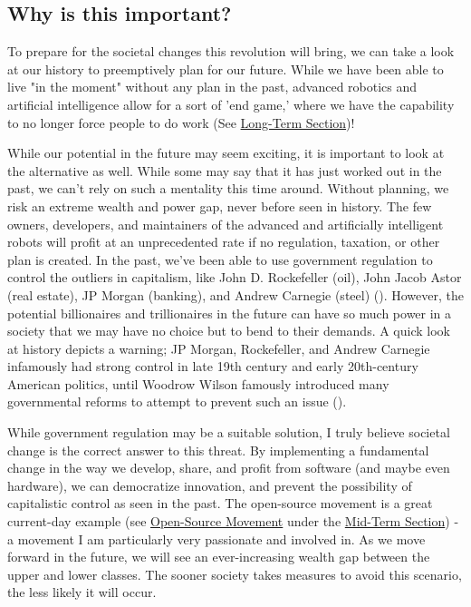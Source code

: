 \subsection{Why is this important?}

To prepare for the societal changes this revolution will bring, we can take a look at our history to preemptively plan for our future. While we have been able to live "in the moment" without any plan in the past, advanced robotics and artificial intelligence allow for a sort of 'end game,' where we have the capability to no longer force people to do work (See \hyperref[sec:long]{Long-Term Section})!

While our potential in the future may seem exciting, it is important to look at the alternative as well. While some may say that it has just worked out in the past, we can't rely on such a mentality this time around. Without planning, we risk an extreme wealth and power gap, never before seen in history. The few owners, developers, and maintainers of the advanced and artificially intelligent robots will profit at an unprecedented rate if no regulation, taxation, or other plan is created. In the past, we've been able to use government regulation to control the outliers in capitalism, like John D. Rockefeller (oil), John Jacob Astor (real estate), JP Morgan (banking), and Andrew Carnegie (steel) (\cite{CapitalistAmerica}). However, the potential billionaires and trillionaires in the future can have so much power in a society that we may have no choice but to bend to their demands. A quick look at history depicts a warning; JP Morgan, Rockefeller, and Andrew Carnegie infamously had strong control in late 19th century and early 20th-century American politics, until Woodrow Wilson famously introduced many governmental reforms to attempt to prevent such an issue (\cite{CapitalismSocialismDemocracy}).

While government regulation may be a suitable solution, I truly believe societal change is the correct answer to this threat. By implementing a fundamental change in the way we develop, share, and profit from software (and maybe even hardware), we can democratize innovation, and prevent the possibility of capitalistic control as seen in the past. The open-source movement is a great current-day example (see \hyperref[subsec:open-source]{Open-Source Movement} under the \hyperref[sec:mid]{Mid-Term Section}) - a movement I am particularly very passionate and involved in. As we move forward in the future, we will see an ever-increasing wealth gap between the upper and lower classes. The sooner society takes measures to avoid this scenario, the less likely it will occur.

